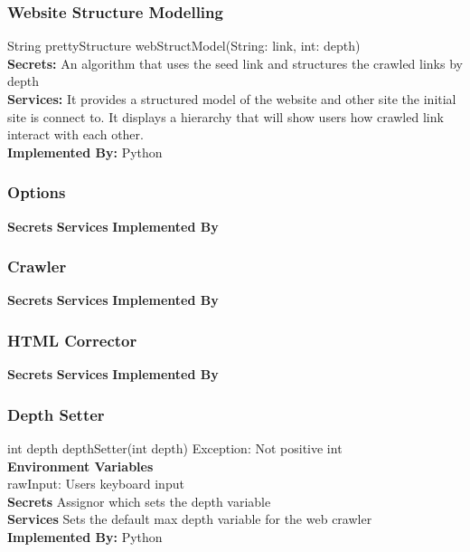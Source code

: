 \documentclass[titlepage]{article}
\begin{document}
\subsubsection{Website Structure Modelling}
String prettyStructure webStructModel(String: link, int: depth)\\
\textbf{Secrets:}
 An algorithm that uses the seed link and structures the crawled links by depth\\
\textbf{Services:}
It provides a structured model of the website and other site the initial site is connect to. It displays a hierarchy that will show users how crawled link interact with each other.\\
\textbf{Implemented By:} Python

\subsubsection{Options}
\textbf{Secrets}
\textbf{Services}
\textbf{Implemented By}

\subsubsection{Crawler}
\textbf{Secrets}
\textbf{Services}
\textbf{Implemented By}

\subsubsection{HTML Corrector}
\textbf{Secrets}
\textbf{Services}
\textbf{Implemented By}

\subsubsection{Depth Setter}
int depth depthSetter(int depth) Exception: Not positive int\\
\textbf{Environment Variables}\\
rawInput: Users keyboard input\\
\textbf{Secrets}
Assignor which sets the depth variable  \\
\textbf{Services}
Sets the default max depth variable for the web crawler\\
\textbf{Implemented By:} Python
\end{document}
